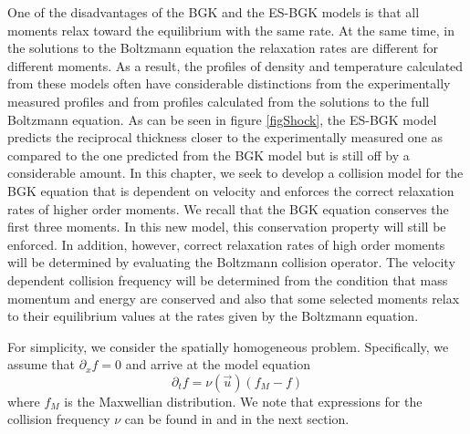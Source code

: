 One of the disadvantages of the BGK and the ES-BGK models is that all moments relax toward the equilibrium with the same rate. At the same time, in the solutions to the Boltzmann equation the relaxation rates are different for different moments. As a result, the profiles of density and temperature calculated from these models often have considerable distinctions from the experimentally measured profiles and from profiles calculated from the solutions to the full Boltzmann equation. As can be seen in figure \ref{figShock}, the ES-BGK model predicts the reciprocal thickness closer to the experimentally measured one as compared to the one predicted from the BGK model but is still off by a considerable amount. In this chapter, we seek to develop a collision model for the BGK equation that is dependent on velocity and enforces the correct relaxation rates of higher order moments. We recall that the BGK equation conserves the first three moments. In this new model, this conservation property will still be enforced. In addition, however, correct relaxation rates of high order moments will be determined by evaluating the Boltzmann collision operator. The velocity dependent collision frequency will be determined from the  condition that mass momentum and energy are conserved and also that some selected moments relax to their equilibrium values at the rates given by the Boltzmann equation.

For simplicity, we consider the spatially homogeneous problem. Specifically, we assume that $\partial_x f=0$ and arrive at the model equation
%
\begin{equation}
\label{EqCh5}
\partial_t f = \nu(\vec{u}) (f_M - f)
\end{equation}
%
where $f_M$ is the Maxwellian distribution. We note that expressions for the collision frequency $\nu$ can be found in \cite{mie} and in the next section.
